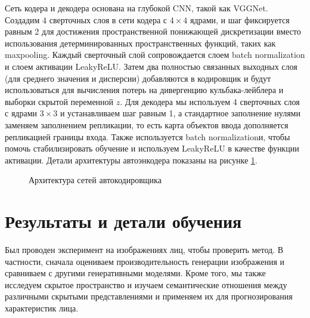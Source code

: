 Сеть кодера и декодера основана на глубокой CNN, такой как VGGNet. Создадим 4 сверточных слоя в сети кодера с $4 \times 4$ ядрами, и шаг фиксируется равным 2 для достижения пространственной понижающей дискретизации вместо использования детерминированных пространственных функций, таких как maxpooling. Каждый сверточный слой сопровождается слоем batch normalization и слоем активации LeakyReLU. Затем два полностью связанных выходных слоя (для среднего значения и дисперсии) добавляются в кодировщик и будут использоваться для вычисления потерь на дивергенцию кульбака-лейблера и выборки скрытой переменной $z$. Для декодера мы используем 4 сверточных слоя с ядрами $3 \times 3$ и устанавливаем шаг равным 1, а стандартное заполнение нулями заменяем заполнением репликации, то есть карта объектов ввода дополняется репликацией границы входа. Также используется batch normalizationи, чтобы помочь стабилизировать обучение и используем LeakyReLU в качестве функции активации. Детали архитектуры автоэнкодера показаны на рисунке \ref{fig:detail}.

 \begin{figure}[H]
	\caption{Архитектура сетей автокодировщика}
	\label{fig:detail}
\end{figure}

\section{Результаты и детали обучения}

Был проводен эксперимент на изображениях лиц, чтобы проверить метод. В частности, сначала оцениваем производительность генерации изображения и сравниваем с другими генеративными моделями. Кроме того, мы также исследуем скрытое пространство и изучаем семантические отношения между различными скрытыми представлениями и применяем их для прогнозирования характеристик лица.

